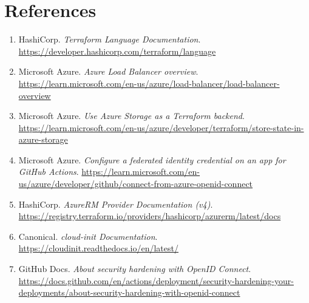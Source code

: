 \documentclass[10pt,a4paper,twocolumn]{article}
\begin{document}
\section{References}

\begin{enumerate}
  \item HashiCorp. \emph{Terraform Language Documentation}.
        \url{https://developer.hashicorp.com/terraform/language}

  \item Microsoft Azure. \emph{Azure Load Balancer overview}.
        \url{https://learn.microsoft.com/en-us/azure/load-balancer/load-balancer-overview}

  \item Microsoft Azure. \emph{Use Azure Storage as a Terraform backend}.
        \url{https://learn.microsoft.com/en-us/azure/developer/terraform/store-state-in-azure-storage}

  \item Microsoft Azure. \emph{Configure a federated identity credential
        on an app for GitHub Actions}.
        \url{https://learn.microsoft.com/en-us/azure/developer/github/connect-from-azure-openid-connect}

  \item HashiCorp. \emph{AzureRM Provider Documentation (v4)}.
        \url{https://registry.terraform.io/providers/hashicorp/azurerm/latest/docs}

  \item Canonical. \emph{cloud-init Documentation}.
        \url{https://cloudinit.readthedocs.io/en/latest/}

  \item GitHub Docs. \emph{About security hardening with OpenID Connect}.
        \url{https://docs.github.com/en/actions/deployment/security-hardening-your-deployments/about-security-hardening-with-openid-connect}
\end{enumerate}
\end{document}
